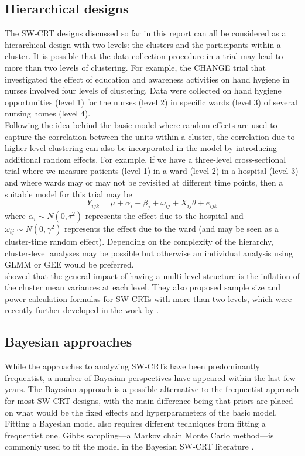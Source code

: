 \documentclass[10pt]{article}
\begin{document}
\subsection{Hierarchical designs}

The SW-CRT designs discussed so far in this report can all be considered as a hierarchical design with two levels: the clusters and the participants within a cluster. It is possible that the data collection procedure in a trial may lead to more than two levels of clustering. For example, the CHANGE trial \parencite{Lescure:2021} that investigated the effect of education and awareness activities on hand hygiene in nurses involved four levels of clustering. Data were collected on hand hygiene opportunities (level 1) for the nurses (level 2) in specific wards (level 3) of several nursing homes (level 4).
\\

Following the idea behind the basic model where random effects are used to capture the correlation between the units within a cluster, the correlation due to higher-level clustering can also be incorporated in the model by introducing additional random effects. For example, if we have a three-level cross-sectional trial where we measure patients (level 1) in a ward (level 2) in a hospital (level 3) and where wards may or may not be revisited at different time points, then a suitable model for this trial may be
\[
Y_{ijk} = \mu + \alpha_i + \beta_j + \omega_{ij} + X_{ij}\theta + e_{ijk}
\]
where $\alpha_i\sim N(0,\tau^2)$ represents the effect due to the hospital and $\omega_{ij}\sim N(0,\gamma^2)$ represents the effect due to the ward (and may be seen as a cluster-time random effect). Depending on the complexity of the hierarchy, cluster-level analyses may be possible but otherwise an individual analysis using GLMM or GEE would be preferred.
\\

\textcite{Teerenstra:2019} showed that the general impact of having a multi-level structure is the inflation of the cluster mean variances at each level. They also proposed sample size and power calculation formulas for SW-CRTs with more than two levels, which were recently further developed in the work by \textcite{DavisPlourde:2021}.

\subsection{Bayesian approaches}

While the approaches to analyzing SW-CRTs have been predominantly frequentist, a number of Bayesian perspectives have appeared within the last few years. The Bayesian approach is a possible alternative to the frequentist approach for most SW-CRT designs, with the main difference being that priors are placed on what would be the fixed effects and hyperparameters of the basic model. Fitting a Bayesian model also requires different techniques from fitting a frequentist one. Gibbs sampling---a Markov chain Monte Carlo method---is commonly used to fit the model in the Bayesian SW-CRT literature \parencite{Cunanan:2016,Zhan:2021}.
\\
\end{document}
